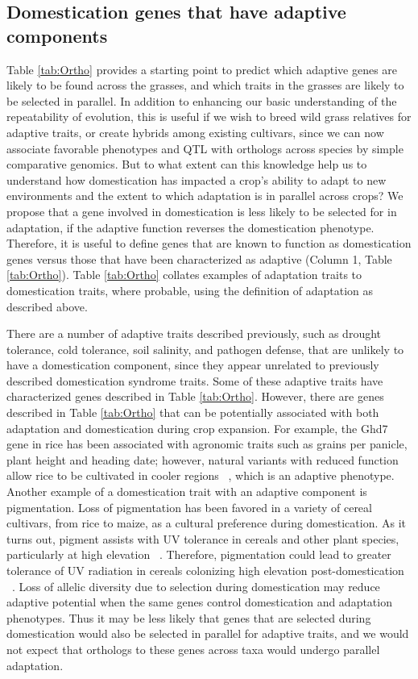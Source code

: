 \documentclass[12pt]{article}
\newcommand{\mbh}[1]{\textcolor{red}{\normalsize  #1}}
\newcommand{\mw}[1]{\textcolor{green}{\normalsize #1}}
\begin{document}
\subsection*{Domestication genes that have adaptive components}
Table \ref{tab:Ortho} provides a starting point to predict which adaptive genes are likely to be found across the grasses, and which traits in the grasses are likely to be selected in parallel.
In addition to enhancing our basic understanding of the repeatability of evolution, this is useful if we wish to breed wild grass relatives for adaptive traits, or create hybrids among existing cultivars, since we can now associate favorable phenotypes and QTL with orthologs across species by simple comparative genomics.
But to what extent can this knowledge help us to understand how domestication has impacted a crop's ability to adapt to new environments and the extent to which adaptation is in parallel across crops? We propose that a gene involved in domestication is less likely to be selected for in adaptation, if the adaptive function reverses the domestication phenotype. 
Therefore, it is useful to define genes that are known to function as domestication genes versus those that have been characterized as adaptive (Column 1, Table \ref{tab:Ortho}). Table \ref{tab:Ortho} collates examples of adaptation traits to domestication traits, where probable, using the definition of adaptation as described above. 

There are a number of adaptive traits described previously, such as drought tolerance, cold tolerance, soil salinity, and pathogen defense, that are unlikely to have a domestication component, since they appear unrelated to previously described domestication syndrome traits. Some of these adaptive traits have characterized genes described in Table \ref{tab:Ortho}. However, there are genes described in Table \ref{tab:Ortho} that can be potentially associated with both adaptation and domestication during crop expansion.
For example, the Ghd7 gene in rice has been associated with agronomic traits such as grains per panicle, plant height and heading date; however, natural variants with reduced function allow rice to be cultivated in cooler regions ~\citep{Xue2008}, which is an adaptive phenotype. 
Another example of a domestication trait with an adaptive component is pigmentation.
Loss of pigmentation has been favored in a variety of cereal cultivars, from rice to maize, as a cultural preference during domestication.
As it turns out, pigment assists with UV tolerance in cereals and other plant species, particularly at high elevation ~\citep{pmid8058838, Gould2004}.
Therefore, pigmentation could lead to greater tolerance of UV radiation in cereals colonizing high elevation post-domestication ~\citep{Pyhjrvi2013}.
Loss of allelic diversity due to selection during domestication may reduce adaptive potential when the same genes control domestication and adaptation phenotypes.
Thus it may be less likely that genes that are selected during domestication would also be selected in parallel for adaptive traits, and we would not expect that orthologs to these genes across taxa would undergo parallel adaptation.
\end{document}
